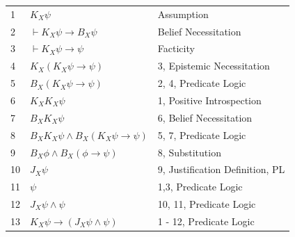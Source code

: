 \documentclass[12pt, titlepage, twoside, a4paper]{report}
\begin{document}
\begin{table}[h]
\begin{tabular}{lll}
1  & $K_X\psi$                                  & Assumption                            \\
2  & $\vdash K_X\psi \to B_X\psi$               & Belief Necessitation                  \\
3  & $\vdash K_X\psi \to \psi $                 & Facticity                             \\
4  & $K_X(K_X\psi \to \psi  )$                  & 3, Epistemic Necessitation       \\
5  & $B_X(K_X\psi \to \psi )$                   & 2, 4, Predicate Logic           \\
6  & $K_XK_X \psi$                              & 1, Positive Introspection        \\
7  & $B_XK_X\psi $                              & 6, Belief Necessitation          \\
8  & $B_XK_X\psi \wedge B_X(K_X\psi \to \psi )$\qquad \qquad \qquad \qquad \qquad \qquad & 5, 7, Predicate Logic           \\
9  & $B_X\phi \wedge B_X(\phi \to \psi)$        & 8, Substitution                  \\
10 & $J_X\psi$                                  & 9, Justification Definition, PL \\
11 & $\psi$                                     & 1,3, Predicate Logic            \\
12 & $J_X \psi \wedge \psi$                     & 10, 11, Predicate Logic         \\
13 & $K_X\psi \to (J_X\psi \wedge \psi )$       & 1 - 12, Predicate Logic         
\end{tabular}
\end{table}
\end{document}
